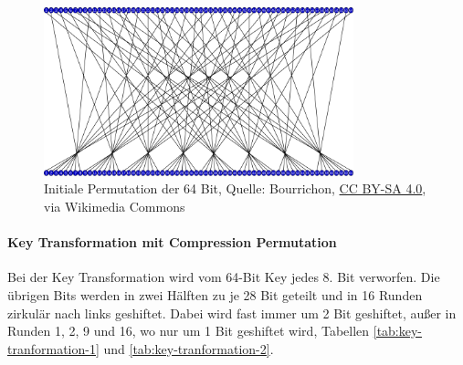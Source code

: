 \begin{figure}[h]
    \includegraphics[width=0.8\textwidth]{figures/fig04-Permutation_initiale.png}
    \centering
    \caption{Initiale Permutation der 64 Bit, Quelle: Bourrichon, \href{https://creativecommons.org/licenses/by-sa/4.0}{CC BY-SA 4.0}, via Wikimedia Commons}
\end{figure}

\paragraph{Key Transformation mit Compression Permutation}

Bei der Key Transformation wird vom 64-Bit Key jedes 8. Bit verworfen. Die übrigen Bits werden in zwei Hälften zu je 28 Bit geteilt und in 16 Runden zirkulär nach links 
geshiftet. Dabei wird fast immer um 2 Bit geshiftet, außer in Runden 1, 2, 9 und 16, wo nur um 1 Bit geshiftet wird, Tabellen \ref{tab:key-tranformation-1} und 
\ref{tab:key-tranformation-2}.

